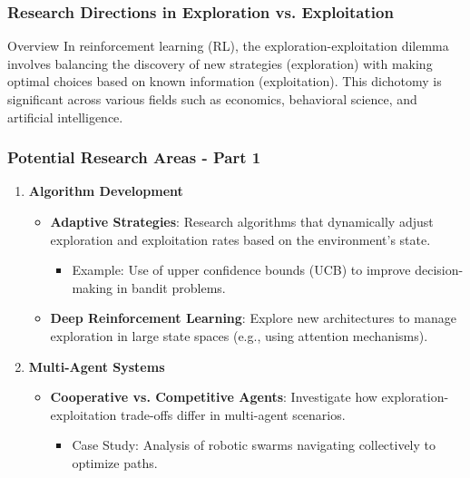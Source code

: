 \documentclass[aspectratio=169]{beamer}
\begin{document}
\begin{frame}[fragile]
    \frametitle{Research Directions in Exploration vs. Exploitation}
    \begin{block}{Overview}
        In reinforcement learning (RL), the exploration-exploitation dilemma involves balancing the discovery of new strategies (exploration) with making optimal choices based on known information (exploitation). This dichotomy is significant across various fields such as economics, behavioral science, and artificial intelligence.
    \end{block}
\end{frame}

\begin{frame}[fragile]
    \frametitle{Potential Research Areas - Part 1}
    \begin{enumerate}
        \item \textbf{Algorithm Development}
        \begin{itemize}
            \item \textbf{Adaptive Strategies}: Research algorithms that dynamically adjust exploration and exploitation rates based on the environment’s state.
            \begin{itemize}
                \item Example: Use of upper confidence bounds (UCB) to improve decision-making in bandit problems.
            \end{itemize}
            \item \textbf{Deep Reinforcement Learning}: Explore new architectures to manage exploration in large state spaces (e.g., using attention mechanisms).
        \end{itemize}
        
        \item \textbf{Multi-Agent Systems}
        \begin{itemize}
            \item \textbf{Cooperative vs. Competitive Agents}: Investigate how exploration-exploitation trade-offs differ in multi-agent scenarios.
            \begin{itemize}
                \item Case Study: Analysis of robotic swarms navigating collectively to optimize paths.
            \end{itemize}
        \end{itemize}
    \end{enumerate}
\end{frame}
\end{document}
